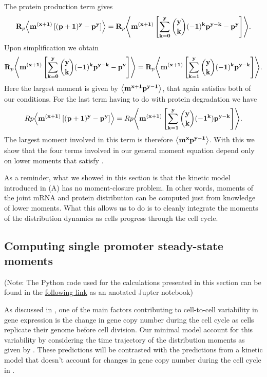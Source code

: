 The protein production term gives
\begin{equation}
  \mathbf{R}_p \mathbf{\left\langle m^{(x + 1)} \left[ (p + 1)^y - p^y \right] \right\rangle} =
  \mathbf{R}_p \mathbf{\left\langle m^{(x + 1)} \left[ \sum_{k=0}^y {y \choose k} (-1)^k p^{y-k}
                                - p^y \right] \right\rangle}.
\end{equation}
Upon simplification we obtain
\begin{equation}
  \mathbf{R}_p \mathbf{\left\langle m^{(x + 1)} \left[ \sum_{k=0}^y {y \choose k} (-1)^k p^{y-k}
                                - p^y \right] \right\rangle} =
  \mathbf{R}_p \mathbf{\left\langle m^{(x + 1)} \left[ \sum_{k=1}^y {y \choose k}(-1)^k p^{y-k}
  \right] \right\rangle}.
\end{equation}
Here the largest moment is given by $\mathbf{\left\langle m^{x+1} p^{y-1} \right\rangle}$, that again
satisfies both of our conditions. For the last term having to do with protein
degradation we have
\begin{equation}
  Rp \mathbf{\left\langle m^{(x + 1)} \left[ (p + 1)^y - p^y \right] \right\rangle} =
  Rp \mathbf{\left\langle m^{(x + 1)} \left[ \sum_{k=1}^y {y \choose k} (-1^k) p^{y - k}
  \right] \right\rangle}.
\end{equation}
The largest moment involved in this term is therefore $\mathbf{\left\langle m^x p^{y-1} \right\rangle}$.
With this we show that the four terms involved in our general moment equation
depend only on lower moments that satisfy .

As a reminder, what we showed in this section is that the kinetic model
introduced in (A) has no moment-closure problem. In
other words, moments of the joint mRNA and protein distribution can be computed
just from knowledge of lower moments. What this allows us to do is to cleanly
integrate the moments of the distribution dynamics as cells progress through the
cell cycle.

\subsection{Computing single promoter steady-state moments}

(Note: The Python code used for the calculations presented in this section can
be found in the
\href{https://www.rpgroup.caltech.edu//chann_cap/software/chemical_master_steady_state_moments_general.html}{following
link} as an anotated Jupter notebook)

As discussed in , one of the main factors contributing to
cell-to-cell variability in gene expression is the change in gene copy number
during the cell cycle as cells replicate their genome before cell division. Our
minimal model account for this variability by considering the time trajectory of
the distribution moments as given by . These
predictions will be contrasted with the predictions from a kinetic model that
doesn't account for changes in gene copy number during the cell cycle in
.

